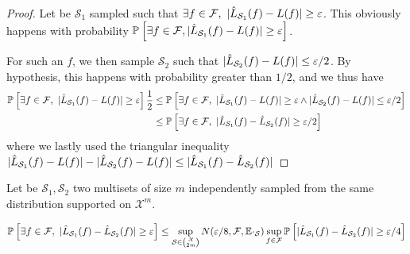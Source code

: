 \begin{proof}
	Let be $\mathcal{S}_1$ sampled such that $\exists f \in \mathcal{F},\ |\estloss{\mathcal{S}_1}(\query) - \loss(\query)| \geq \epsilon$. This obviously happens with probability $\mathbb{P}_{}\left[\exists f \in \mathcal{F}, |\hat{L}_{\mathcal{S}_1}(f) - L(f)| \geq \varepsilon \right]$.

	For such an $f$, we then sample $\mathcal{S}_2$ such that $|\hat{L}_{\mathcal{S}_2}(f) -  L(f)| \leq \varepsilon/2$. By hypothesis, this happens with probability greater than $1/2$, and we thus have
	\begin{align*}
		\mathbb{P}_{}\left[ \exists f \in \mathcal{F},\ \lvert \hat{L}_{\mathcal{S}_1}(f) - L(f)\rvert \geq \varepsilon\right]
		\frac 1 2 
		&\leq \mathbb{P}_{}\left[\exists f \in \mathcal{F},\ \lvert \hat{L}_{\mathcal{S}_1}(f) - L(f)\rvert \geq \varepsilon \wedge \lvert\hat{L}_{\mathcal{S}_2}(f) - L(f)\rvert \leq \varepsilon/2 \right] \\
		&\leq \mathbb{P}_{}\left[\exists f \in \mathcal{F},\ \lvert \hat{L}_{\mathcal{S}_1}(f) - \hat{L}_{\mathcal{S}_2}(f) \rvert \geq \varepsilon/2 \right]
	\end{align*}
	where we lastly used the triangular inequality $ \lvert \hat{L}_{\mathcal{S}_1}(f) - L(f)\rvert - \lvert\hat{L}_{\mathcal{S}_2}(f) - L(f)\rvert \leq   \lvert \hat{L}_{\mathcal{S}_1}(f) - \hat{L}_{\mathcal{S}_2}(f) \rvert  $
\end{proof}



\begin{lemma}[Conjecture ]
	Let be $\mathcal{S}_1, \mathcal{S}_2$ two multisets of size $m$ independently sampled from the same distribution supported on $\mathcal{X}^m$. 
	

	\begin{equation}
		\PPP{}{\exists f \in \mathcal{F},\ \lvert \estloss{\mathcal{S}_1}(\query) - \estloss{\mathcal{S}_2}(\query) \rvert \geq \epsilon} \leq \sup_{\mathcal{S} \in \binom{\mathcal{X}}{2m} } N(\epsilon/8, \mathcal{F}, \EE \cdot_{\mathcal{S}}) \sup_{f \in \mathcal{F}} \PPP{}{\lvert \estloss{\mathcal{S}_1}(\query) - \estloss{\mathcal{S}_2}(\query) \rvert \geq \epsilon/4 }
	\end{equation}

\end{lemma}


